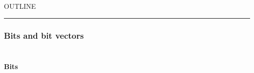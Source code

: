 


    OUTLINE
  \tableofcontents
\begin{center}
\rule{3in}{0.4pt}
\end{center}

\subsubsection{Bits and bit vectors}\hypertarget{bits-and-bit-vectors}{}\label{bits-and-bit-vectors}

\begin{align*}
  [ \
  \KEY{Type} \quad & \NAMEREF{bits} \\
  \KEY{Datatype} \quad & \NAMEREF{bit-vectors} \\
  \KEY{Funcon} \quad & \NAMEREF{bit-vector} \\
  \KEY{Type} \quad & \NAMEREF{bytes} \\
  \KEY{Alias} \quad & \NAMEREF{octets} \\
  \KEY{Funcon} \quad & \NAMEREF{bit-vector-not} \\
  \KEY{Funcon} \quad & \NAMEREF{bit-vector-and} \\
  \KEY{Funcon} \quad & \NAMEREF{bit-vector-or} \\
  \KEY{Funcon} \quad & \NAMEREF{bit-vector-xor} \\
  \KEY{Funcon} \quad & \NAMEREF{bit-vector-shift-left} \\
  \KEY{Funcon} \quad & \NAMEREF{bit-vector-logical-shift-right} \\
  \KEY{Funcon} \quad & \NAMEREF{bit-vector-arithmetic-shift-right} \\
  \KEY{Funcon} \quad & \NAMEREF{integer-to-bit-vector} \\
  \KEY{Funcon} \quad & \NAMEREF{bit-vector-to-integer} \\
  \KEY{Funcon} \quad & \NAMEREF{bit-vector-to-natural} \\
  \KEY{Funcon} \quad & \NAMEREF{unsigned-bit-vector-maximum} \\
  \KEY{Funcon} \quad & \NAMEREF{signed-bit-vector-maximum} \\
  \KEY{Funcon} \quad & \NAMEREF{signed-bit-vector-minimum} \\
  \KEY{Funcon} \quad & \NAMEREF{is-in-signed-bit-vector} \\
  \KEY{Funcon} \quad & \NAMEREF{is-in-unsigned-bit-vector}
  \ ]
\end{align*}
\paragraph{Bits}\hypertarget{bits}{}\label{bits}

